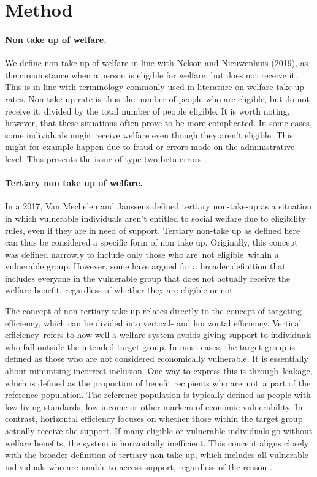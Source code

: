 \section{Method} 

\paragraph{Non take up of welfare.}

We define non take up of welfare in line with Nelson and Nieuwenhuis (2019), as the circumstance when a person is eligible for welfare, but does not receive it. This is in line with terminology commonly used in literature on welfare take up rates. Non take up rate is thus the number of people who are eligible, but do not receive it, divided by the total number of people eligible. It is worth noting, however, that these situations often prove to be more complicated. In some cases, some individuals might receive welfare even though they aren’t eligible. This might for example happen due to fraud or errors made on the administrative level. This presents the issue of type two beta errors \citep{herber_non-take-up_2019, nelson_towards_2021}.

\paragraph{Tertiary non take up of welfare.}
In a 2017, Van Mechelen and Janssens defined tertiary non-take-up as a situation in which vulnerable individuals aren’t entitled to social welfare due to eligibility rules, even if they are in need of support. Tertiary non-take up as defined here can thus be considered a specific form of non take up. Originally, this concept was defined narrowly to include only those who are not eligible within a vulnerable group. However, some have argued for a broader definition that includes everyone in the vulnerable group that does not actually receive the welfare benefit, regardless of whether they are eligible or not \citep{goedeme_concept_2020, mechelen_who_2017}.

The concept of non tertiary take up relates directly to the concept of targeting efficiency, which can be divided into vertical- and horizontal efficiency. Vertical efficiency refers to how well a welfare system avoids giving support to individuals who fall outside the intended target group. In most cases, the target group is defined as those who are not considered economically vulnerable. It is essentially about minimising incorrect inclusion. One way to express this is through leakage, which is defined as the proportion of benefit recipients who are not a part of the reference population. The reference population is typically defined as people with low living standards, low income or other markers of economic vulnerability. In contrast, horizontal efficiency focuses on whether those within the target group actually receive the support. If many eligible or vulnerable individuals go without welfare benefits, the system is horizontally inefficient. This concept aligns closely with the broader definition of tertiary non take up, which includes all vulnerable individuals who are unable to access support, regardless of the reason \citep{goedeme_concept_2020, mechelen_who_2017}.


